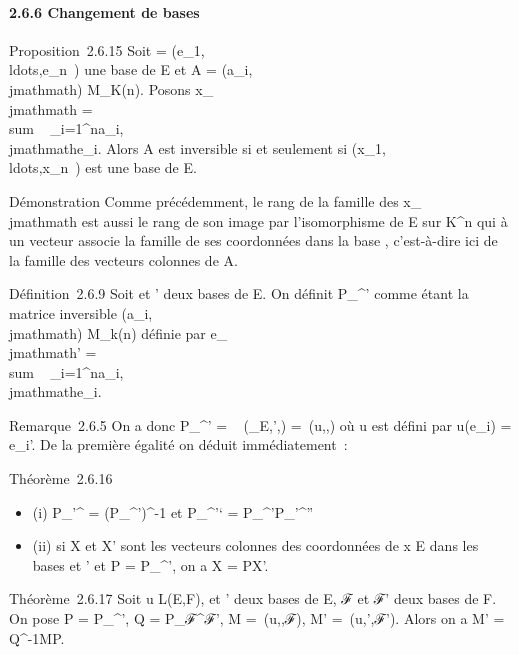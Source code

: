 \documentclass[]{article}
\begin{document}
\paragraph{2.6.6 Changement de bases}

Proposition~2.6.15 Soit  =
(e_1,\\ldots,e_n~)
une base de E et A = (a_i,\\jmathmath) \in M_K(n). Posons
x_\\jmathmath = \\sum ~
_i=1^na_i,\\jmathmathe_i. Alors A est inversible
si et seulement si
(x_1,\\ldots,x_n~)
est une base de E.

Démonstration Comme précédemment, le rang de la famille des x_\\jmathmath
est aussi le rang de son image par l'isomorphisme de E sur
K^n qui à un vecteur associe la famille de ses coordonnées
dans la base , c'est-à-dire ici de la famille des vecteurs colonnes de
A.

Définition~2.6.9 Soit  et ' deux bases de E. On définit
P_^' comme étant la matrice inversible
(a_i,\\jmathmath) \in M_k(n) définie par e_\\jmathmath'
= \\sum ~
_i=1^na_i,\\jmathmathe_i.

Remarque~2.6.5 On a donc P_^'
= \mathrmMat~
(\mathrmId_E,',) =\
\mathrmMat (u,,) où u est défini par
u(e_i) = e_i'. De la première égalité on déduit
immédiatement~:

Théorème~2.6.16

\begin{itemize}
\itemsep1pt\parskip0pt
\item
  (i) P_'^ = (P_^')^-1 et
  P_^'` =
  P_^'P_\mathcal{E}'^''
\item
  (ii) si X et X' sont les vecteurs colonnes des coordonnées de x \in E
  dans les bases  et ' et P = P_\mathcal{E}^\mathcal{E}', on a X = PX'.
\end{itemize}

Théorème~2.6.17 Soit u \in L(E,F),  et ' deux bases de E, ℱ et ℱ' deux
bases de F. On pose P = P_^\mathcal{E}', Q =
P_ℱ^ℱ', M =\
\mathrmMat (u,\mathcal{E},ℱ), M' =\
\mathrmMat (u,',ℱ'). Alors on a M' =
Q^-1MP.
\end{document}
